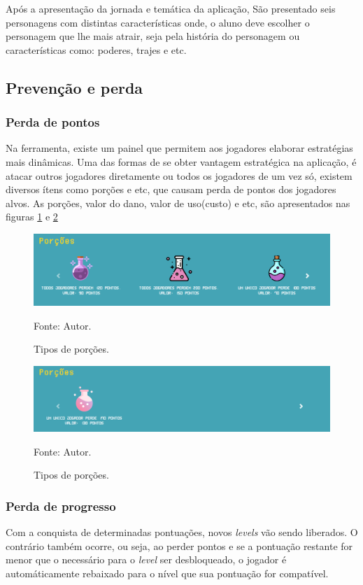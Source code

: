 Após a apresentação da jornada e temática da aplicação, São presentado seis personagens com distintas características onde, o aluno deve escolher o personagem
que lhe mais atrair, seja pela história do personagem ou características como: poderes, trajes e etc.

\subsection{Prevenção e perda}
\subsubsection{Perda de pontos}
Na ferramenta, existe um painel que permitem aos jogadores elaborar estratégias mais dinâmicas. Uma das formas de se obter vantagem estratégica na aplicação, é atacar
outros jogadores diretamente ou todos os jogadores de um vez só, existem diversos ítens como porções e etc, que causam perda de pontos
dos jogadores alvos. As porções, valor do dano, valor de uso(custo) e etc, são apresentados nas figuras \ref{porcoes} e \ref{porcoes2}

\begin{figure}[h]
	\centering
	\includegraphics[keepaspectratio=true,scale=0.4]{figuras/p1.png}
	\caption{Tipos de porções.}
	Fonte: Autor.
	\label{porcoes}
\end{figure}

\begin{figure}[h]
	\centering
	\includegraphics[keepaspectratio=true,scale=0.4]{figuras/p2.png}
	\caption{Tipos de porções.}
	Fonte: Autor.
	\label{porcoes2}
\end{figure}

\subsubsection{Perda de progresso}
Com a conquista de determinadas pontuações, novos \textit{levels} vão sendo liberados. O contrário também ocorre, ou seja, ao perder 
pontos e se a pontuação restante for menor que o necessário para o \textit{level} ser desbloqueado, o jogador é 
automáticamente rebaixado para o nível que sua pontuação for compatível.

